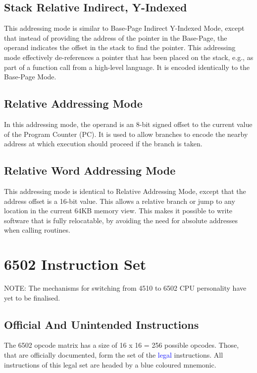 \subsection{Stack Relative Indirect, Y-Indexed}

This addressing mode is similar to Base-Page Indirect Y-Indexed Mode,
except that instead of providing the address of the pointer in the
Base-Page, the operand indicates the offset in the stack to find the
pointer. This addressing mode effectively de-references a pointer that
has been placed on the stack, e.g., as part of a function call from a
high-level language.  It is encoded identically to the Base-Page Mode.

\subsection{Relative Addressing Mode}

In this addressing mode, the operand is an 8-bit signed offset to the
current value of the Program Counter (PC). It is used to allow branches
to encode the nearby address at which execution should proceed if the
branch is taken.

\subsection{Relative Word Addressing Mode}

This addressing mode is identical to Relative Addressing Mode, except that
the address offset is a 16-bit value. This allows a relative branch or jump
to any location in the current 64KB memory view.  This makes it possible
to write software that is fully relocatable, by avoiding the need for absolute
addresses when calling routines.

\clearpage
\section{6502 Instruction Set}

NOTE: The mechanisms for switching from 4510 to 6502 CPU personality
have yet to be finalised.

\subsection{Official And Unintended Instructions}

The 6502 opcode matrix has a size of 16 x 16 = 256 possible opcodes.
Those, that are officially documented, form the set of the
\textcolor{blue}{legal} instructions.
All instructions of this legal set are headed by a blue coloured mnemonic.

